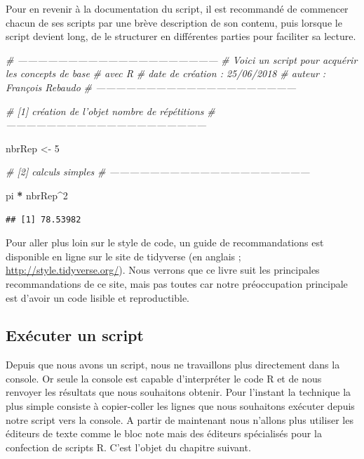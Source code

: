\documentclass[
]{book}
\newenvironment{Shaded}{\begin{snugshade}}{\end{snugshade}}
\newcommand{\CommentTok}[1]{\textcolor[rgb]{0.56,0.35,0.01}{\textit{#1}}}
\newcommand{\DecValTok}[1]{\textcolor[rgb]{0.00,0.00,0.81}{#1}}
\newcommand{\NormalTok}[1]{#1}
\newcommand{\OperatorTok}[1]{\textcolor[rgb]{0.81,0.36,0.00}{\textbf{#1}}}
\newcommand{\StringTok}[1]{\textcolor[rgb]{0.31,0.60,0.02}{#1}}
\begin{document}
Pour en revenir à la documentation du script, il est recommandé de commencer chacun de ses scripts par une brève description de son contenu, puis lorsque le script devient long, de le structurer en différentes parties pour faciliter sa lecture.

\begin{Shaded}
\begin{Highlighting}[]
\CommentTok{# ------------------------------------------------------------}
\CommentTok{# Voici un script pour acquérir les concepts de base }
\CommentTok{# avec R}
\CommentTok{# date de création : 25/06/2018}
\CommentTok{# auteur : François Rebaudo}
\CommentTok{# ------------------------------------------------------------}

\CommentTok{# [1] création de l'objet nombre de répétitions}
\CommentTok{# ------------------------------------------------------------}

\NormalTok{nbrRep <-}\StringTok{ }\DecValTok{5}

\CommentTok{# [2] calculs simples}
\CommentTok{# ------------------------------------------------------------}

\NormalTok{pi }\OperatorTok{*}\StringTok{ }\NormalTok{nbrRep}\OperatorTok{^}\DecValTok{2}
\end{Highlighting}
\end{Shaded}

\begin{verbatim}
## [1] 78.53982
\end{verbatim}

Pour aller plus loin sur le style de code, un guide de recommandations est disponible en ligne sur le site de tidyverse (en anglais ; \url{http://style.tidyverse.org/}). Nous verrons que ce livre suit les principales recommandations de ce site, mais pas toutes car notre préoccupation principale est d'avoir un code lisible et reproductible.

\hypertarget{exuxe9cuter-un-script}{%
\subsection{Exécuter un script}\label{exuxe9cuter-un-script}}

Depuis que nous avons un script, nous ne travaillons plus directement dans la console. Or seule la console est capable d'interpréter le code R et de nous renvoyer les résultats que nous souhaitons obtenir. Pour l'instant la technique la plus simple consiste à copier-coller les lignes que nous souhaitons exécuter depuis notre script vers la console. A partir de maintenant nous n'allons plus utiliser les éditeurs de texte comme le bloc note mais des éditeurs spécialisés pour la confection de scripts R. C'est l'objet du chapitre suivant.
\end{document}
